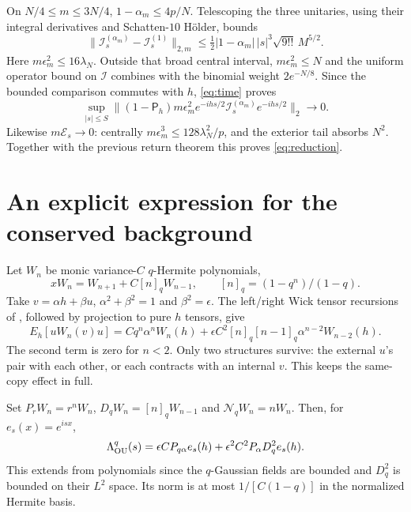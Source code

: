 \documentclass[11pt,a4paper]{article}
\newcommand{\PP}{\mathsf P_h}
\begin{document}
On $N/4\le m\le3N/4$, $1-\alpha_m\le4p/N$.
Telescoping the three unitaries, using their integral derivatives
and Schatten-$10$ H\"older, bounds
\begin{equation}
 \|\mathcal I_s^{(\alpha_m)}-\mathcal I_s^{(1)}\|_{2,m}
 \le\tfrac12|1-\alpha_m|\,|s|^3\sqrt{9!!}\,M^{5/2}.
\end{equation}
Here $m\epsilon_m^2\le16\lambda_N$. Outside that broad central
interval, $m\epsilon_m^2\le N$ and the uniform operator bound on
$\mathcal I$ combines with the binomial weight $2e^{-N/8}$.
Since the bounded comparison commutes with $h$, \eqref{eq:time} proves
\begin{equation}
 \boxed{\quad\sup_{|s|\le S}
 \|(1-\PP)m\epsilon_m^2e^{-ihs/2}
                 \mathcal I_s^{(\alpha_m)}e^{-ihs/2}\|_2\to0.\quad}
\end{equation}
Likewise $m\mathcal E_s\to0$: centrally
$m\epsilon_m^3\le128\lambda_N^2/p$, and the exterior tail absorbs $N^2$.
Together with the previous return theorem this proves \eqref{eq:reduction}.

\newpage
\section{An explicit expression for the conserved background}
Let $W_n$ be monic variance-$C$ $q$-Hermite polynomials,
\begin{equation}
 xW_n=W_{n+1}+C[n]_qW_{n-1},\qquad [n]_q=(1-q^n)/(1-q).
\end{equation}
Take $v=\alpha h+\beta u$, $\alpha^2+\beta^2=1$ and
$\beta^2=\epsilon$. The left/right Wick tensor recursions of
\cite{BKS}, followed by projection to pure $h$ tensors, give
\begin{equation}
 E_h[uW_n(v)u]=Cq^n\alpha^nW_n(h)
 +\epsilon C^2[n]_q[n-1]_q\alpha^{n-2}W_{n-2}(h).
 \label{eq:OUWick}
\end{equation}
The second term is zero for $n<2$. Only two structures survive:
the external $u$'s pair with each other, or each contracts with
an internal $v$. This keeps the same-copy effect in full.

Set $P_rW_n=r^nW_n$, $D_qW_n=[n]_qW_{n-1}$ and
$\mathcal N_qW_n=nW_n$. Then, for $e_s(x)=e^{isx}$,
\begin{equation}
 \Lambda^q_{\rm OU}(s)=\epsilon CP_{q\alpha}e_s(h)
                +\epsilon^2C^2P_\alpha D_q^2e_s(h).
\end{equation}
This extends from polynomials since the $q$-Gaussian fields are
bounded and $D_q^2$ is bounded on their $L^2$ space.
Its norm is at most $1/[C(1-q)]$ in the normalized Hermite basis.
\end{document}

